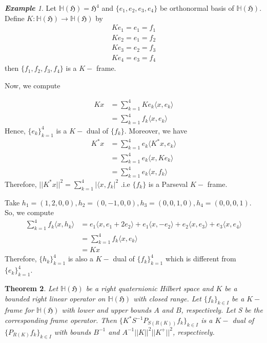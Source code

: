 \documentclass[a4paper,12pt,reqno]{amsart}
\theoremstyle{plain}
\newtheorem{theorem}{\bf Theorem}[section]
\theoremstyle{remark}
\newtheorem{example}[theorem]{\bf Example}
\begin{document}
	\begin{example}
		Let $\mathbb{H}(\mathfrak{H})=\mathfrak{H}^4$ and $\{e_1,e_2,e_3,e_4\}$ be orthonormal basis of $\mathbb{H}(\mathfrak{H})$. Define $K:\mathbb{H}(\mathfrak{H})\to\mathbb{H}(\mathfrak{H})$ by 
		\begin{align*}
			Ke_1=e_1=f_1\\
			Ke_2=e_1=f_2\\
			Ke_3=e_2=f_3\\
			Ke_4=e_3=f_4
		\end{align*}
		then $\{f_1,f_2,f_3,f_4\}$ is a $K-$ frame. 
		
		Now, we compute 
		
		\begin{align*}
			Kx&=\sum_{k=1}^4 Ke_k \langle x, e_k\rangle \\
			&=\sum_{k=1}^4 f_k \langle x ,e_k\rangle 
		\end{align*}
		Hence, $\{e_k\}_{k=1}^4$ is a $K-$ dual of $\{f_k\}.$ Moreover, we have
		\begin{align*}
			K^*x&=\sum_{k=1}^4 e_k \langle K^*x, e_k\rangle \\
			&=\sum_{k=1}^4 e_k \langle x, Ke_k\rangle \\
			&=\sum_{k=1}^4 e_k \langle x, f_k\rangle 
		\end{align*}
		Therefore, $||K^*x||^2=\sum_{k=1}^4|\langle x, f_k|^2$ .i.e $\{f_k\}$ is a Parseval $K-$ frame. 
		
		Take  $h_1=(1,2,0,0), h_2=(0,-1,0,0), h_3=(0,0,1,0), h_4=(0,0,0,1)$. So, we compute 
		\begin{align*}
			\sum_{k=1}^4 f_k \langle x, h_k\rangle &= e_1 \langle x, e_1+2e_2\rangle +e_1 \langle x, -e_2\rangle +e_2\langle x, e_3\rangle +e_3\langle x, e_4\rangle \\
			&= \sum_{k=1}^4 f_k\langle x, e_k\rangle \\&=Kx
		\end{align*}
		Therefore, $\{h_k\}_{k=1}^4$ is also a $K-$ dual of $\{f_k\}_{k=1}^4$ which is different from $\{e_k\}_{k=1}^4$. 
	\end{example}
	
	\begin{theorem}
		Let $\mathbb{H}(\mathfrak{H})$ be a right quaternionic Hilbert space and $K$ be a bounded right linear operator on $\mathbb{H}(\mathfrak{H})$ with closed range. Let $\{f_k\}_{k\in I}$ be a $K-$ frame for $\mathbb{H}(\mathfrak{H})$ with lower and upper bounds $A$ and $B$, respectively. Let S be the corresponding frame operator. Then $\{K^* S^{-1}P_{S(R(K))}f_k\}_{k\in I}$ is a $K-$ dual of $\{P_{R(K)}f_k\}_{k\in I}$ with bounds $B^{-1}$ and $A^{-1}||K||^2||K^{+}||^2$, respectively.
	\end{theorem}
	
\end{document}
